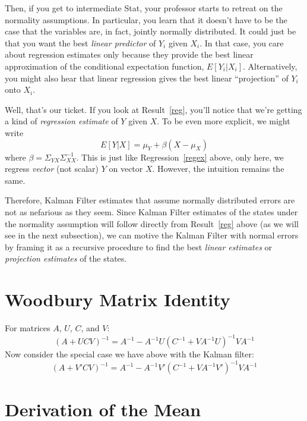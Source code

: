 \documentclass[a4paper,12pt]{article}
\begin{document}
Then, if you get to intermediate Stat, your professor starts to retreat
on the normality assumptions. In particular, you learn that it doesn't
have to be the case that the variables are, in fact, jointly normally
distributed. It could just be that you want the best \emph{linear
predictor} of $Y_i$ given $X_i$. In that case, you care about regression
estimates only because they provide the best linear approximation of the
conditional expectation function, $E[Y_i|X_i]$. Alternatively, you might
also hear that linear regression gives the best linear ``projection'' of
$Y_i$ onto $X_i$. 

Well, that's our ticket. If you look at Result~\ref{reg}, you'll notice
that we're getting a kind of \emph{regression estimate} of $Y$ given
$X$. To be even more explicit, we might write
\[
  E[Y|X] = \mu_Y + \beta (X - \mu_X) 
\]
where $\beta= \Sigma_{YX}\Sigma^{-1}_{XX}$. This is just like
Regression~\ref{regex} above, only here, we regress \emph{vector} (not
scalar) $Y$ on vector $X$. However, the intuition remains the same.

Therefore, Kalman Filter estimates that assume normally distributed
errors are not as nefarious as they seem. Since Kalman Filter estimates
of the states under the normality assumption will follow directly from
Result~\ref{reg} above (as we will see in the next subsection), we can
motive the Kalman Filter with normal errors by framing it as a recursive
procedure to find the best \emph{linear estimates} or \emph{projection
estimates} of the states. 



\section{Woodbury Matrix Identity}

For matrices $A$, $U$, $C$, and $V$:
\begin{equation}
    (A+UCV)^{-1} = A^{-1} - A^{-1} U(C^{-1} + VA^{-1}U)^{-1}
	VA^{-1}
\end{equation}
Now consider the special case we have above with the
Kalman filter:
\begin{equation}
    \label{special}
    (A + V'CV)^{-1} = A^{-1} - A^{-1} V'(C^{-1} + VA^{-1}V')^{-1}
	VA^{-1}
\end{equation}

\section{Derivation of the Mean}
\end{document}
